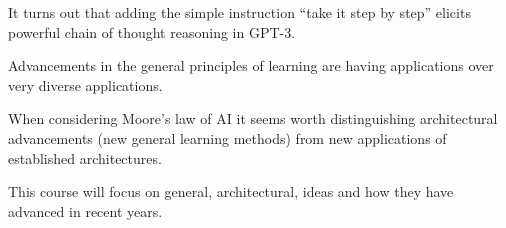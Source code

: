{It turns out that adding the simple instruction ``take it step by step'' elicits powerful chain of thought reasoning in GPT-3.


Advancements in the general principles of learning are having applications over very diverse applications.

\vfill
When considering Moore's law of AI it seems worth distinguishing architectural advancements (new general learning methods)
from new applications of established architectures.

\vfill
This course will focus on general, architectural, ideas and how they have advanced in recent years.


}

